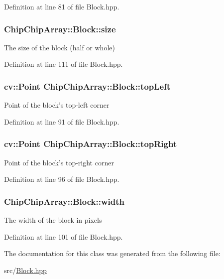 Definition at line 81 of file Block.\+hpp.

\hypertarget{classChipChipArray_1_1Block_aebd356d7fcfe7ff11db8195e6d7f8e42}{
\subsubsection[{size}]{ Chip\+Chip\+Array\+::\+Block\+::size}}\label{classChipChipArray_1_1Block_aebd356d7fcfe7ff11db8195e6d7f8e42}
The size of the block (half or whole) 

Definition at line 111 of file Block.\+hpp.

\hypertarget{classChipChipArray_1_1Block_aeecc05025c6c8e23ff6ca09a6fbd4b4b}{
\subsubsection[{top\+Left}]{\setlength{\rightskip}{0pt plus 5cm}cv\+::\+Point Chip\+Chip\+Array\+::\+Block\+::top\+Left}}\label{classChipChipArray_1_1Block_aeecc05025c6c8e23ff6ca09a6fbd4b4b}
Point of the block's top-\/left corner 

Definition at line 91 of file Block.\+hpp.

\hypertarget{classChipChipArray_1_1Block_aaa4ff82846e95a628800ebdfd3ceefb5}{
\subsubsection[{top\+Right}]{\setlength{\rightskip}{0pt plus 5cm}cv\+::\+Point Chip\+Chip\+Array\+::\+Block\+::top\+Right}}\label{classChipChipArray_1_1Block_aaa4ff82846e95a628800ebdfd3ceefb5}
Point of the block's top-\/right corner 

Definition at line 96 of file Block.\+hpp.

\hypertarget{classChipChipArray_1_1Block_ac3f815e8aa9060c4ad20d4e1b2649e35}{
\subsubsection[{width}]{ Chip\+Chip\+Array\+::\+Block\+::width}}\label{classChipChipArray_1_1Block_ac3f815e8aa9060c4ad20d4e1b2649e35}
The width of the block in pixels 

Definition at line 101 of file Block.\+hpp.



The documentation for this class was generated from the following file\+:\begin{DoxyCompactItemize}
\item 
src/\hyperlink{Block_8hpp}{Block.\+hpp}\end{DoxyCompactItemize}
